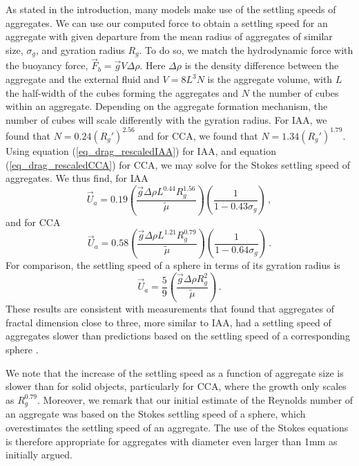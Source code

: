As stated in the introduction, many models make use of the settling speeds of aggregates. We can use our computed force to obtain a settling speed for an aggregate with given departure from the mean radius of aggregates of similar size, $\sigma_g$, and gyration radius $R_g$. To do so, we match the hydrodynamic force with the buoyancy force, $\vec{F}_b = \vec{g} V \Delta \rho$. Here $\Delta \rho$ is the density difference between the aggregate and the external fluid and $V=8L^3N$ is the aggregate volume, with $L$ the half-width of the cubes forming the aggregates and $N$ the number of cubes within an aggregate. Depending on the aggregate formation mechanism, the number of cubes will scale differently with the gyration radius. For IAA, we found that $N=0.24(R_g')^{2.56}$ and for CCA, we found that $N=1.34 (R_g')^{1.79}$. Using equation (\ref{eq_drag_rescaledIAA}) for IAA, and equation (\ref{eq_drag_rescaledCCA}) for CCA, we may solve for the Stokes settling speed of aggregates. We thus find, for IAA
\begin{equation}
\vec{U}_a = 0.19  \left( \frac{\vec{g} \Delta \rho L^{0.44} R_g^{1.56}}{\tilde{\mu}} \right)  \left( \frac{1}{1-0.43\sigma_g}  \right)\,,
\end{equation}
and for CCA
\begin{equation}
\vec{U}_a = 0.58 \left( \frac{\vec{g} \Delta \rho L^{1.21} R_g^{0.79}}{\tilde{\mu}}  \right) \left( \frac{1}{1-0.64\sigma_g}  \right)\, .
\end{equation}
For comparison, the settling speed of a sphere in terms of its gyration radius is  
\begin{equation}
\vec{U}_a = \frac{5}{9} \left( \frac{\vec{g} \Delta \rho R_g^2}{\tilde{\mu}}  \right) \,.
\end{equation}
These results are consistent with measurements that found that aggregates of fractal dimension close to three, more similar to IAA, had a settling speed of aggregates slower than predictions based on the settling speed of a corresponding sphere \cite{alldredge_situ_1988}.

We note that the increase of the settling speed as a function of aggregate size is slower than for solid objects, particularly for CCA, where the growth only scales as $R_g^{0.79}$. Moreover, we remark that our initial estimate of the Reynolds number of an aggregate was based on the Stokes settling speed of a sphere, which overestimates the settling speed of an aggregate. The use of the Stokes equations is therefore appropriate for aggregates with diameter even larger than 1mm as initially argued.
 
